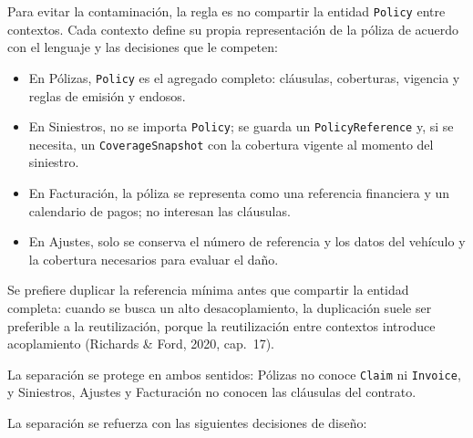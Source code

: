 \documentclass[12pt,a4paper]{article}
\begin{document}
Para evitar la contaminación, la regla es no compartir la entidad \texttt{Policy} entre contextos. Cada contexto define su propia representación de la póliza de acuerdo con el lenguaje y las decisiones que le competen:

\begin{itemize}[label=$\cdot$]
  \item En Pólizas, \texttt{Policy} es el agregado completo: cláusulas, coberturas, vigencia y reglas de emisión y endosos.
  \item En Siniestros, no se importa \texttt{Policy}; se guarda un \texttt{PolicyReference} y, si se necesita, un \texttt{CoverageSnapshot} con la cobertura vigente al momento del siniestro.
  \item En Facturación, la póliza se representa como una referencia financiera y un calendario de pagos; no interesan las cláusulas.
  \item En Ajustes, solo se conserva el número de referencia y los datos del vehículo y la cobertura necesarios para evaluar el daño.
\end{itemize}

Se prefiere duplicar la referencia mínima antes que compartir la entidad completa: cuando se busca un alto desacoplamiento, la duplicación suele ser preferible a la reutilización, porque la reutilización entre contextos introduce acoplamiento (Richards \& Ford, 2020, cap.~17).

La separación se protege en ambos sentidos: Pólizas no conoce \texttt{Claim} ni \texttt{Invoice}, y Siniestros, Ajustes y Facturación no conocen las cláusulas del contrato.

La separación se refuerza con las siguientes decisiones de diseño:
\end{document}
